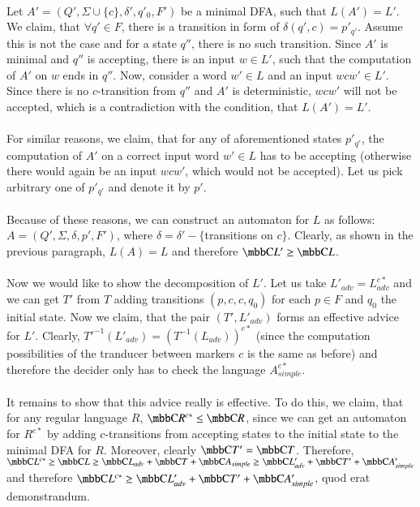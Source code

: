 \paragraph{}
Let $A' = (Q', \Sigma \cup \{c\}, \delta', q'_0, F')$ be a minimal DFA, such that $L(A') = L'$. We claim, that $\forall q' \in F$, there is a transition in form of $\delta(q', c) = p'_{q'}$. Assume this is not the case and for a state $q''$, there is no such transition. Since $A'$ is minimal and $q''$ is accepting, there is an input $w \in L'$, such that the computation of $A'$ on $w$ ends in $q''$. Now, consider a word $w' \in L$ and an input $wcw' \in L'$. Since there is no $c$-transition from $q''$ and $A'$ is deterministic, $wcw'$ will not be accepted, which is a contradiction with the condition, that $L(A') = L'$.

\paragraph{}
For similar reasons, we claim, that for any of aforementioned states $p'_{q'}$, the computation of $A'$ on a correct input word $w' \in L$ has to be accepting (otherwise there would again be an input $wcw'$, which would not be accepted). Let us pick arbitrary one of $p'_{q'}$ and denote it by $p'$.

\paragraph{}
Because of these reasons, we can construct an automaton for $L$ as follows: $A = (Q',  \Sigma, \delta, p',  F')$, where $\delta = \delta' - \{$transitions on $c \}$. Clearly, as shown in the previous paragraph, $L(A) = L$ and therefore $\C{L'} \geq \C{L}$.

\paragraph{}
Now we would like to show the decomposition of $L'$. Let us take $L'_{adv} = L_{adv}^{c*}$ and we can get $T'$ from $T$ adding transitions $(p, c, c, q_0)$ for each $p \in F$ and $q_0$ the initial state. Now we claim, that the pair $(T', L'_{adv})$ forms an effective advice for $L'$. Clearly, $T'^{-1}(L'_{adv}) = (T^{-1}(L_{adv}))^{c*}$ (since the computation possibilities of the tranducer between markers $c$ is the  same as before) and therefore the decider only has to check the language $A_{simple}^{c*}$.

\paragraph{}
It remains to show that this advice really is effective. To do this, we claim, that for any regular language $R$, $\C{R^{c*}} \leq \C{R}$, since we can get an automaton for $R^{c*}$ by adding $c$-transitions from accepting states to the initial state to the minimal DFA for $R$. Moreover, clearly $\C{T'} = \C{T}$. Therefore, $\C{L^{c*}} \geq \C{L} \geq \C{L_{adv}} + \C{T} + \C{A_{simple}} \geq \C{L'_{adv}} + \C{T'} + \C{A'_{simple}}$ and therefore $\C{L^{c*}} \geq \C{L'_{adv}} + \C{T'} + \C{A'_{simple}}$, quod erat demonstrandum. \\
\square
